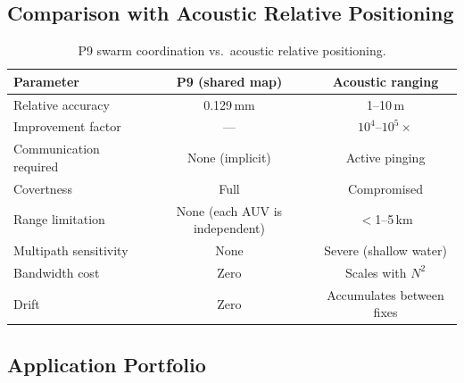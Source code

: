 \documentclass[11pt]{article}
\theoremstyle{definition}
\theoremstyle{remark}
\begin{document}
\subsection{Comparison with Acoustic Relative Positioning}

\begin{table}[H]
\centering
\caption{P9 swarm coordination vs.\ acoustic relative positioning.}
\label{tab:swarm-comparison}
\begin{tabular}{@{}lcc@{}}
\toprule
Parameter & P9 (shared map) & Acoustic ranging \\
\midrule
Relative accuracy & 0.129\,mm & 1--10\,m \\
Improvement factor & --- & $10^4$--$10^5\times$ \\
Communication required & None (implicit) & Active pinging \\
Covertness & Full & Compromised \\
Range limitation & None (each AUV is independent) & $<$1--5\,km \\
Multipath sensitivity & None & Severe (shallow water) \\
Bandwidth cost & Zero & Scales with $N^2$ \\
Drift & Zero & Accumulates between fixes \\
\bottomrule
\end{tabular}
\end{table}

\subsection{Application Portfolio}
\end{document}
